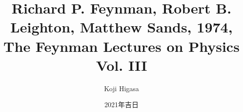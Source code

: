 \title{Richard P. Feynman, Robert B. Leighton, Matthew Sands, 1974, The Feynman Lectures on Physics Vol. III}
\author{Koji Higasa}
\date{2021年吉日}
